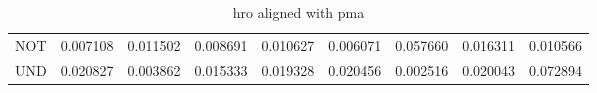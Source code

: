 \begin{table}[H]
\begin{center}
{\begin{tabular}{lrrrrrrrr}
NOT & {\cellcolor[HTML]{FAFDC9}} \color[HTML]{000000} 0.007108 & {\cellcolor[HTML]{F6FCB8}} \color[HTML]{000000} 0.011502 & {\cellcolor[HTML]{F9FDC2}} \color[HTML]{000000} 0.008691 & {\cellcolor[HTML]{F7FCBA}} \color[HTML]{000000} 0.010627 & {\cellcolor[HTML]{FBFDCF}} \color[HTML]{000000} 0.006071 & {\cellcolor[HTML]{30954F}} \color[HTML]{F1F1F1} 0.057660 & {\cellcolor[HTML]{E8F6AE}} \color[HTML]{000000} 0.016311 & {\cellcolor[HTML]{F7FCBC}} \color[HTML]{000000} 0.010566 \\
UND & {\cellcolor[HTML]{DBF1A4}} \color[HTML]{000000} 0.020827 & {\cellcolor[HTML]{FCFED7}} \color[HTML]{000000} 0.003862 & {\cellcolor[HTML]{EBF7B0}} \color[HTML]{000000} 0.015333 & {\cellcolor[HTML]{DEF2A7}} \color[HTML]{000000} 0.019328 & {\cellcolor[HTML]{DCF1A5}} \color[HTML]{000000} 0.020456 & {\cellcolor[HTML]{FEFFDE}} \color[HTML]{000000} 0.002516 & {\cellcolor[HTML]{DDF1A6}} \color[HTML]{000000} 0.020043 & {\cellcolor[HTML]{006636}} \color[HTML]{F1F1F1} 0.072894 \\
\bottomrule
\end{tabular}
}\end{center}
\caption{hro aligned with pma}\end{table}